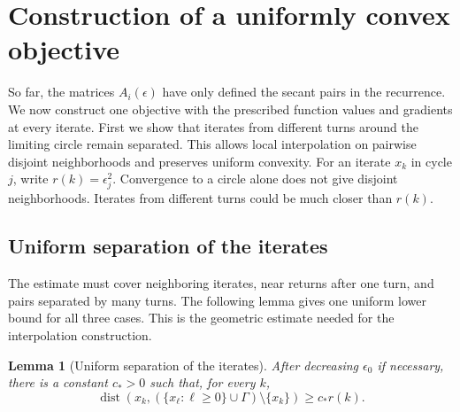 \documentclass[11pt]{article}
\newtheorem{lemma}[theorem]{Lemma}
\begin{document}
\section{Construction of a uniformly convex objective}
\label{sec:global-objective}

So far, the matrices $A_i(\epsilon)$ have only defined the secant pairs in the
recurrence.  We now construct one objective with the prescribed function
values and gradients at every iterate.  First we show that iterates from
different turns around the limiting circle remain separated.  This allows
local interpolation on pairwise disjoint neighborhoods and preserves uniform
convexity.  For an iterate $x_k$ in cycle $j$, write $r(k)=\epsilon_j^2$.
Convergence to a circle alone does not give disjoint neighborhoods.  Iterates
from different turns could be much closer than $r(k)$.

\subsection{Uniform separation of the iterates}

The estimate must cover neighboring iterates, near returns after one turn, and
pairs separated by many turns.  The following lemma gives one uniform lower
bound for all three cases.  This is the geometric estimate needed for the
interpolation construction.

\begin{lemma}[Uniform separation of the iterates]\label{lem:separation}
After decreasing $\epsilon_0$ if necessary, there is a constant $c_*>0$ such
that, for every $k$,
\begin{equation}\label{eq:separation}
\operatorname{dist}\!\left(
x_k,(\{x_\ell:\ell\ge0\}\cup\Gamma)\setminus\{x_k\}
\right)
\ge c_*r(k).
\end{equation}
\end{lemma}
\end{document}
